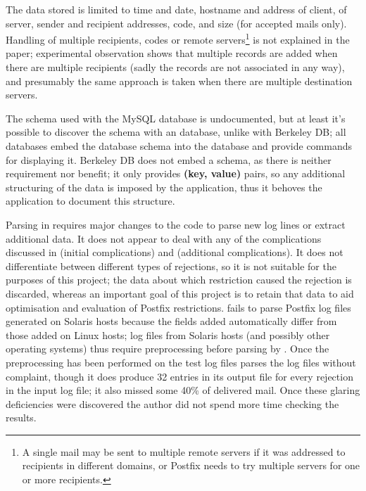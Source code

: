 The data stored is limited to time and date, hostname and \IP{} address of
client, \IP{} of server, sender and recipient addresses, \SMTP{} code, and
size (for accepted mails only).  Handling of multiple recipients, \SMTP{}
codes or remote servers\footnote{A single mail may be sent to multiple
remote servers if it was addressed to recipients in different domains, or
Postfix needs to try multiple servers for one or more recipients.} is not
explained in the paper; experimental observation shows that multiple
records are added when there are multiple recipients (sadly the records are
not associated in any way), and presumably the same approach is taken when
there are multiple destination servers.

The schema used with the MySQL database is undocumented, but at least it's
possible to discover the schema with an \SQL{} database, unlike with
Berkeley DB\@; all \SQL{} databases embed the database schema into the
database and provide commands for displaying it.  Berkeley DB does not
embed a schema, as there is neither requirement nor benefit; it only
provides \textbf{(key, value)} pairs, so any additional structuring of the
data is imposed by the application, thus it behoves the application to
document this structure.

Parsing in \LMA{} requires major changes to the code to parse new log lines
or extract additional data.  It does not appear to deal with any of the
complications discussed in  (initial
complications) and  (additional
complications).  It does not differentiate between different types of
rejections, so it is not suitable for the purposes of this project; the
data about which restriction caused the rejection is discarded, whereas an
important goal of this project is to retain that data to aid optimisation
and evaluation of Postfix restrictions.  \LMA{} fails to parse Postfix log
files generated on Solaris hosts because the fields added automatically
differ from those added on Linux hosts; log files from Solaris hosts (and
possibly other operating systems) thus require preprocessing before parsing
by \LMA{}.  Once the preprocessing has been performed on the
\numberOFlogFILES{} test log files \LMA{} parses the log files without
complaint, though it does produce 32 entries in its output file for every
rejection in the input log file; it also missed some 40\% of delivered
mail.  Once these glaring deficiencies were discovered the author did not
spend more time checking the results.

